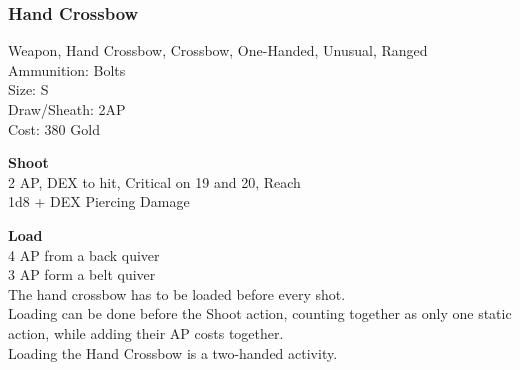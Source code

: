 \subsubsection{Hand Crossbow}\label{weapon:handCrossbow}
Weapon, Hand Crossbow, Crossbow, One-Handed, Unusual, Ranged\\
Ammunition: Bolts\\
Size: S\\
Draw/Sheath: 2AP\\
Cost: 380 Gold

\textbf{Shoot} \\
2 AP, DEX to hit, Critical on 19 and 20,  Reach\\
1d8 + \texttimes DEX Piercing Damage

\textbf{Load} \\
4 AP from a back quiver\\
3 AP form a belt quiver\\
The hand crossbow has to be loaded before every shot.\\
Loading can be done before the Shoot action, counting together as only one static action, while adding their AP costs together.\\
Loading the Hand Crossbow is a two-handed activity.

